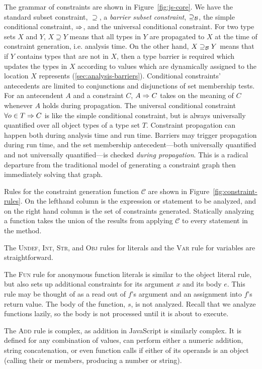 The grammar of constraints are shown in Figure~\ref{fig:js-core}. We have the
standard subset constraint, $\supseteq$, a \emph{barrier subset
  constraint}, $\supseteq_\mathcal{B}$, the simple conditional constraint, $\Rightarrow$, and the universal conditional constraint.
For two type sets $X$ and $Y$, $X \supseteq
Y$ means that all types in $Y$ are propagated to $X$ at the time of constraint generation, i.e. analysis time. On the other hand, $X
\supseteq_\mathcal{B} Y$ means that if $Y$ contains types that are not in $X$, then a
type barrier is required which updates the types in $X$
according to values which are dynamically assigned to the location
$X$ represents (\Section\ref{sec:analysis-barriers}).
Conditional constraints' antecedents are limited to conjunctions and
disjunctions of set membership tests. For an antecendent $A$ and a constraint
$C$, $A \Rightarrow C$ takes on the meaning of $C$ whenever $A$ holds during
propagation. The universal conditional constraint $\forall o \in T \Rightarrow C$
is like the simple conditional constraint, but is always universally
quantified over all object types of a type set $T$.
Constraint propagation can happen both during analysis time and run
time. Barriers may trigger propagation during run time, and the set membership
antecedent---both universally quantified and not universally quantified---is
checked \emph{during propagation}. This is a radical departure from the
traditional model of generating a constraint graph then immediately solving
that graph.

Rules for the constraint generation function $\mathcal{C}$ are shown in
Figure~\ref{fig:constraint-rules}. On the lefthand column is the expression or
statement to be analyzed, and on the right hand column is the set of constraints
generated. Statically analyzing a function takes the union of
the results from applying $\mathcal{C}$ to every statement in the method.

The \textsc{Undef}, \textsc{Int}, \textsc{Str}, and \textsc{Obj}
rules for literals and the \textsc{Var} rule for variables are
straightforward.

The \textsc{Fun} rule for anonymous function literals is similar to the object
literal rule, but also sets up additional constraints for its argument $x$ and
its body $e$. This rule may be thought of as a read out of $f$'s argument and an
assignment into $f$'s return value. The body of the function, $s$, is not analyzed. Recall that we analyze functions lazily, so the body is not processed until it is about to execute.

The \textsc{Add} rule is complex, as addition in JavaScript is similarly complex. It is
defined for any combination of values, can perform either a numeric addition,
string concatenation, or even function calls if either of its operands is an
object (calling their  or  members, producing a
number or string).

